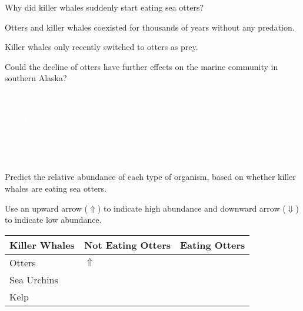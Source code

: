 \documentclass[t]{beamer}
\begin{document}
\begin{frame}[t]{Why did killer whales suddenly start eating sea otters?}

	\hangpara Otters and killer whales coexisted for thousands of years without any predation.

	\hangpara Killer whales only recently switched to otters as prey.

	\hangpara Could the decline of otters have further effects on the marine community in southern Alaska?

\end{frame}
%
{
\begin{frame}[b]{\textcolor{white}{I am essential to the community. Now, let me eat.}}
\end{frame}
}
%
{
\begin{frame}[b]
	\hfill \tiny \textcolor{white}{Kirk L. Onthank, Wikimedia, }
\end{frame}
}
%
{
\begin{frame}[b]
	\hfill \tiny \textcolor{white}{Peter Southwood, Wikimedia, }
\end{frame}
}
%
{
\begin{frame}[b]
	 \tiny \textcolor{white}{\copyright\ National Geographic}
\end{frame}
}
%

\begin{frame}{Predict the relative abundance of each type of organism, based on whether killer whales are eating sea otters.}

Use an upward arrow ($\Uparrow$) to indicate high abundance and downward arrow ($\Downarrow$) to indicate low abundance.

\begin{center}
\begin{tabular}{@{}L{1in}C{1.2in}C{1.0in}@{}}
	\toprule
	Killer Whales	& Not Eating Otters		& Eating Otters \\
	\midrule
	Otters			& $\Uparrow$	& \\[2ex]
	Sea Urchins		&				& \\[2ex]
	Kelp			&				& \\
	\bottomrule
\end{tabular}
\end{center}
\end{frame}
%
\end{document}
